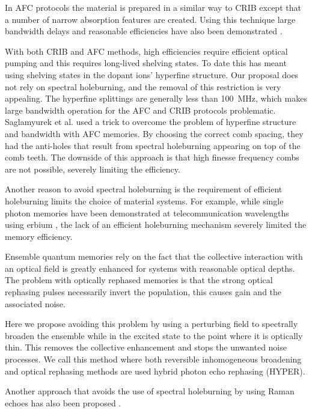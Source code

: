 \documentclass[superscriptaddress,pra,twocolumn,showpacs,amsmath,amssymb,aps,a4paper]{revtex4}
\begin{document}
In AFC protocols the material is prepared in a similar way to CRIB except that
a number of narrow absorption features are created. Using this technique
large bandwidth delays \cite{usma10} and reasonable efficiencies have also been
demonstrated \cite{chan10}.

With both CRIB and AFC methods, high efficiencies require efficient
optical pumping and this requires long-lived shelving states. To date
this has meant using shelving states in the dopant ions' hyperfine
structure.  Our proposal does not rely on spectral holeburning, and
the removal of this restriction is very appealing. The
hyperfine splittings are generally less than 100~MHz, which makes
large bandwidth operation for the AFC and CRIB protocols
problematic. Saglamyurek et al. \cite{sagl10} used a trick to overcome
the problem of hyperfine structure and bandwidth with AFC memories. By
choosing the correct comb spacing, they had the anti-holes that result 
from spectral holeburning appearing on top of the comb teeth. The downside
of this approach is that high finesse frequency combs are not possible,
severely limiting the efficiency.  

Another reason to avoid
spectral holeburning is the requirement of efficient holeburning
limits the choice of material systems. For example, while single
photon memories have been demonstrated at telecommunication
wavelengths using erbium \cite{laur10}, the lack of an efficient
holeburning mechanism severely limited the memory efficiency.


Ensemble quantum memories rely on the fact that the collective
interaction with an optical field is greatly enhanced for systems
with reasonable optical depths. The problem with optically rephased
memories is that the strong optical rephasing pulses necessarily invert
the population, this causes gain and the associated noise. 

Here we propose avoiding this problem by using a perturbing field to
spectrally broaden the ensemble while in the excited state to the
point where it is optically thin. This removes the collective
enhancement and stops the unwanted noise processes. We call this
method where both reversible inhomogeneous broadening and optical
rephasing methods are used hybrid photon echo rephasing (HYPER).

Another approach that avoids the use of spectral holeburning by using
Raman echoes has also been proposed \cite{mois11}. 
\end{document}
